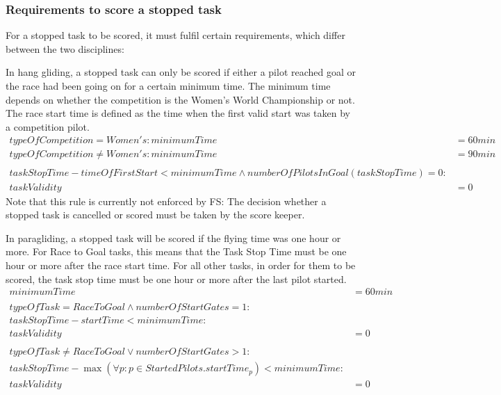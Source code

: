 \documentclass{article}
\begin{document}
\subsubsection{Requirements to score a stopped task}
For a stopped task to be scored, it must fulfil certain requirements, which
differ between the two disciplines:

In hang gliding, a stopped task can only be scored if either a pilot reached
goal or the race had been going on for a certain minimum time. The minimum time
depends on whether the competition is the Women’s World Championship or not.
The race start time is defined as the time when the first valid start was taken
by a competition pilot.
\begin{align*}
    typeOfCompetition = Women's : minimumTime &= 60min \\
    typeOfCompetition \neq Women's : minimumTime &= 90min \\
    \\
    taskStopTime - timeOfFirstStart < minimumTime \land numberOfPilotsInGoal(taskStopTime) = 0 : \\
    taskValidity &= 0
\end{align*}
Note that this rule is currently not enforced by FS: The decision whether
a stopped task is cancelled or scored must be taken by the score keeper.

In paragliding, a stopped task will be scored if the flying time was one hour
or more. For Race to Goal tasks, this means that the Task Stop Time must be one
hour or more after the race start time. For all other tasks, in order for them
to be scored, the task stop time must be one hour or more after the last pilot
started.
\begin{align*}
    minimumTime &= 60min \\
    \\
    typeOfTask = RaceToGoal \land numberOfStartGates = 1 : \\
    taskStopTime - startTime < minimumTime : \\
    taskValidity &= 0 \\
    \\
    typeOfTask \neq RaceToGoal \lor numberOfStartGates > 1 : \\
    taskStopTime - \max(\forall p : p \in StartedPilots . startTime_p) < minimumTime : \\
    taskValidity &= 0
\end{align*}
\end{document}
